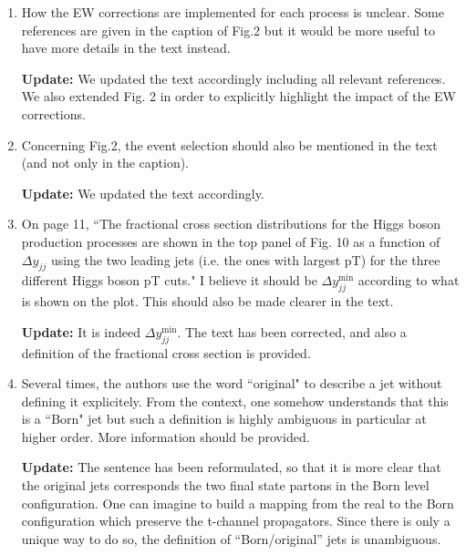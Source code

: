 \documentclass[12pt]{article}
\begin{document}
\begin{enumerate}
{\bf Update:} The ttH process has been included in Fig. 2 for illustration of its impact. However, it is not considered in the rest of the paper. We updated footnote 2 and clarified this. Regarding the implementation of ttH for Fig. 2 we incorporated this information in the main text: for the fiducial selection shown in Fig. 2 (right) indeed the 4j+2j\_b final state has been considered treating bottom jets as jets.

{\bf Update:} JH: I modified the wording of the footnote somewhat and added references for the ATLAS and CMS discovery papers for ttH. 

\item How the EW corrections are implemented for each process is unclear. Some references are given in the caption of Fig.2 but it would be more useful to have more details in the text instead.

{\bf Update:} We updated the text accordingly including all relevant references. We also extended Fig. 2 in order to explicitly highlight the impact of the EW corrections.

\item Concerning Fig.2, the event selection should also be mentioned in the text (and not only in the caption).

{\bf Update:} We updated the text accordingly.

\item On page 11, ``The fractional cross section distributions for the Higgs boson production processes are shown in the top panel of Fig. 10 as a function of $\Delta y_{jj}$ using the two leading jets (i.e. the ones with largest pT) for the three different Higgs boson pT cuts." I believe it should be $\Delta y_{jj}^{\text{min}}$ according to what is shown on the plot. This should also be made clearer in the text.

{\bf Update:} It is indeed $\Delta y_{jj}^{\text{min}}$. The text has been corrected, and also a definition of the fractional cross section is provided.

\item Several times, the authors use the word ``original" to describe a jet without defining it explicitely. From the context, one somehow understands that this is a ``Born" jet but such a definition is highly ambiguous in particular at higher order. More information should be provided.

{\bf Update:} The sentence has been reformulated, so that it is more clear that  the original jets corresponds the two final state partons in the Born level configuration. One can imagine to build a mapping from the real to the Born configuration which preserve the t-channel propagators. Since there is only a unique way to do so, the definition of ``Born/original'' jets is unambiguous.

\end{enumerate}
\end{document}

